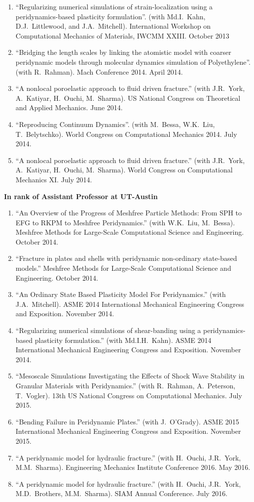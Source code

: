 \begin{enumerate}[resume]
    \item ``Regularizing numerical simulations of strain-localization using a peridynamics-based plasticity formulation''. (with Md.I.~Kahn, D.J.~Littlewood, and J.A.~Mitchell). International Workshop on Computational Mechanics of Materials, IWCMM XXIII. October 2013
    \item ``Bridging the length scales by linking the atomistic model with coarser peridynamic models through molecular dynamics simulation of Polyethylene''. (with R.~Rahman). Mach Conference 2014.  April 2014.
    \item ``A nonlocal poroelastic approach to fluid driven fracture.'' (with J.R.~York, A.~Katiyar, H.~Ouchi, M.~Sharma). US National Congress on Theoretical and Applied Mechanics.  June 2014.
    \item ``Reproducing Continuum Dynamics''. (with M.~Bessa, W.K.~Liu, T.~Belytschko). World Congress on Computational Mechanics 2014.  July 2014.
    \item ``A nonlocal poroelastic approach to fluid driven fracture.'' (with J.R.~York, A.~Katiyar, H.~Ouchi, M.~Sharma). World Congress on Computational Mechanics XI.  July 2014.
\end{enumerate}
    \pagebreak[2]
    \textbf{In rank of Assistant Professor at UT-Austin}
\begin{enumerate}[resume]
    \item ``An Overview of the Progress of Meshfree Particle Methods: From SPH to EFG to RKPM to Meshfree Peridynamics.'' (with W.K.~Liu, M.~Bessa). Meshfree Methods for Large-Scale Computational Science and Engineering. October 2014.
    \item ``Fracture in plates and shells with peridynamic non-ordinary state-based models.''  Meshfree Methods for Large-Scale Computational Science and Engineering. October 2014.
    \item ``An Ordinary State Based Plasticity Model For Peridynamics.'' (with J.A.~Mitchell). ASME 2014 International Mechanical Engineering Congress and Exposition. November 2014.
    \item ``Regularizing numerical simulations of shear-banding using a peridynamics-based plasticity formulation.'' (with Md.I.H.~Kahn). ASME 2014 International Mechanical Engineering Congress and Exposition. November 2014.
    \item ``Mesoscale Simulations Investigating the Effects of Shock Wave Stability in Granular Materials with Peridynamics.'' (with R.~Rahman, A.~Peterson, T.~Vogler). 13th US National Congress on Computational Mechanics. July 2015.
    \item ``Bending Failure in Peridynamic Plates.'' (with J.~O'Grady). ASME 2015 International Mechanical Engineering Congress and Exposition. November 2015.
    \item ``A peridynamic model for hydraulic fracture.'' (with H.\ Ouchi, J.R.\ York, M.M.\ Sharma). Engineering Mechanics Institute Conference 2016. May 2016.
    \item ``A peridynamic model for hydraulic fracture.'' (with H.\ Ouchi, J.R.\ York, M.D.\ Brothers, M.M.\ Sharma). SIAM Annual Conference.  July 2016.
\end{enumerate}
